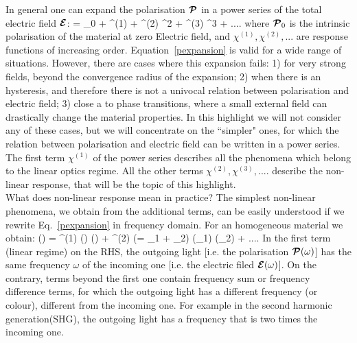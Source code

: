 In general one can expand the polarisation  ${\boldsymbol {\cal P}}$ in a power series of the total electric field ${\boldsymbol {\cal E}}$: 
\be
\PPc = \PPc_0 + \chi^{(1)} \EEc + \chi^{(2)} \EEc^2 + \chi^{(3)} \EEc^3 + ....
\label{pexpansion}
\ee
where ${\boldsymbol {\cal P}}_0$ is the intrinsic polarisation of the material at zero Electric field, and $\chi^{(1)}, \chi^{(2)},...$ are response functions of increasing order. Equation~\ref{pexpansion} is valid for a wide range of situations. However, there are cases where this expansion fails: 1) for very strong fields, beyond the convergence radius of the expansion\cite{lee2014first}; 2) when there is an hysteresis, and therefore there is not a univocal relation between polarisation and electric field; 3) close a to phase transitions, where a small external field can drastically change the material properties. In this highlight we will not consider any of these cases, but we will concentrate on the ``simpler" ones, for which the relation between polarisation and electric field can be written in a power series. \\ 
The first term $\chi^{(1)}$ of the power series describes all the phenomena which belong to the linear optics regime. All the other terms  $\chi^{(2)}, \chi^{(3)},.... $  describe the non-linear response, that will be the topic of this highlight. \\
What does non-linear response mean in practice?  The simplest non-linear phenomena, we obtain from the additional terms,  can be easily understood if we rewrite Eq.~\ref{pexpansion} in frequency domain. For an homogeneous material we obtain:
\be
\PPc(\omega) = \chi^{(1)} (\omega) \EEc(\omega)  + \chi^{(2)} (\omega = \omega_1 + \omega_2) \EEc(\omega_1) \EEc(\omega_2) + ....
\label{pexpomega}
\ee
In the first term (linear regime) on the RHS, the outgoing light [i.e. the polarisation ${\boldsymbol {\cal P}} (\omega)$] has the same frequency $\omega$ of the incoming one [i.e. the electric filed ${\boldsymbol {\cal E}} (\omega)$]. On the contrary, terms beyond the first one contain frequency sum or frequency difference terms, for which the outgoing light has a different frequency (or colour), different from the incoming one.  For example in the second harmonic generation(SHG), the outgoing light has a frequency that is two times the incoming one. \\

